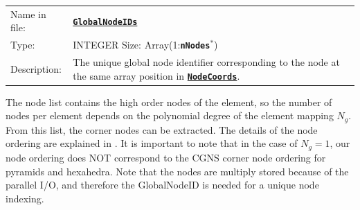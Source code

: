 \documentclass[a4paper,headsepline]{scrreprt}
\newcommand\rf[1]{\prettyref{#1}}
\newcommand\Ngeo{N_g}
\newcommand\ttbf[1]{\textbf{\texttt{#1}}}
\newcommand\NodeCoords{\hyperlink{NodeInfo}{\ttbf{NodeCoords}}}
\newcommand\GlobalNodeIDs{\hyperlink{NodeInfo}{\ttbf{GlobalNodeIDs}}}
\newcommand\nNodes{\ttbf{nNodes}}
\begin{document}
\begin{tabularx}{1.0\textwidth}{lX}
Name in file: & \GlobalNodeIDs\\
Type:         & INTEGER \quad Size: Array(1:\nNodes$^*$) \\
Description:  & The unique global node identifier corresponding to the node at the same array position in \NodeCoords.\\
\end{tabularx}
The node list contains the high order nodes of the element, so the number of nodes per element depends on the polynomial degree of the element mapping $\Ngeo$. From this list, the corner nodes can be extracted. The details of the node ordering are explained in \rf{sec:elemnodes}. It is important to note that in the case of $\Ngeo=1$, our node ordering does NOT correspond to the CGNS corner node ordering for pyramids and hexahedra. Note that the nodes are multiply stored because of the parallel I/O, and therefore the GlobalNodeID is needed for a unique node indexing.
\end{document}
